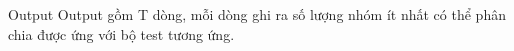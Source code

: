 Output  
Output gồm T dòng, mỗi dòng ghi ra số lượng nhóm ít nhất có thể phân chia được ứng với bộ test tương ứng.